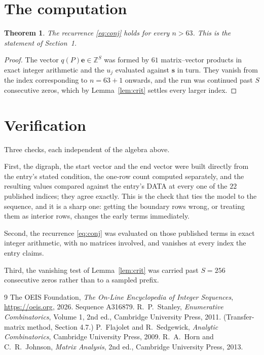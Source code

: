 \documentclass[11pt,a4paper]{article}
\theoremstyle{plain}
\newtheorem{theorem}{Theorem}
\theoremstyle{definition}
\begin{document}
\section{The computation}

\begin{theorem}
The recurrence \eqref{eq:conj} holds for every $n>63$. This is the statement of
Section~1.
\end{theorem}

\begin{proof}
The vector $q(P)\mathbf{e}\in\mathbb{Z}^{S}$ was formed by $61$ matrix--vector
products in exact integer arithmetic and the $u_j$ evaluated against $\mathbf{s}$ in turn.
They vanish from the index corresponding to $n=63+1$ onwards, and the run was continued
past $S$ consecutive zeros, which by Lemma~\ref{lem:crit} settles every larger index.
\end{proof}

\section{Verification}

Three checks, each independent of the algebra above.

First, the digraph, the start vector and the end vector were built directly from the
entry's stated condition, the one-row count computed separately, and the resulting values
compared against the entry's DATA at every one of the $22$ published indices; they
agree exactly. This is the check that ties the model to the sequence, and it is a sharp one:
getting the boundary rows wrong, or treating them as interior rows, changes the early terms
immediately.

Second, the recurrence \eqref{eq:conj} was evaluated on those published terms in exact
integer arithmetic, with no matrices involved, and vanishes at every index the entry claims.

Third, the vanishing test of Lemma~\ref{lem:crit} was carried past $S=256$ consecutive
zeros rather than to a sampled prefix.

\begin{thebibliography}{9}
 The OEIS Foundation, \emph{The On-Line Encyclopedia of Integer
Sequences}, \url{https://oeis.org}, 2026. Sequence A316879.
 R.~P.~Stanley, \emph{Enumerative Combinatorics}, Volume 1, 2nd ed.,
Cambridge University Press, 2011. (Transfer-matrix method, Section 4.7.)
 P.~Flajolet and R.~Sedgewick, \emph{Analytic Combinatorics}, Cambridge
University Press, 2009.
 R.~A.~Horn and C.~R.~Johnson, \emph{Matrix Analysis}, 2nd ed., Cambridge
University Press, 2013.
\end{thebibliography}
\end{document}
